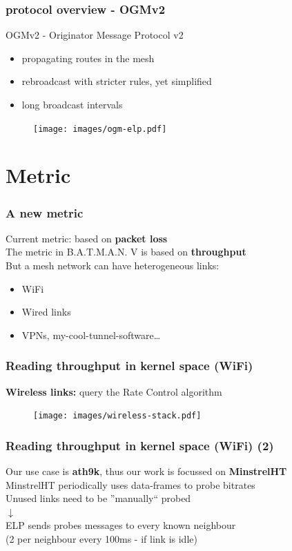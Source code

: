 \documentclass[slidestop]{beamer}
\begin{document}
\begin{frame}[c]
	\frametitle{protocol overview - OGMv2}

	OGMv2 - Originator Message Protocol v2
	\begin{itemize}
		\item propagating routes in the mesh
		\item rebroadcast with stricter rules, yet simplified
		\item long broadcast intervals
	\end{itemize}

	\begin{figure}
		\centering
		\texttt{[image: images/ogm-elp.pdf]}
	\end{figure}
\end{frame}

\section{Metric}
\begin{frame}[c]
	\frametitle{A new metric}
	\begin{center}
		Current metric: based on \textbf{packet loss}\\
		\pause
		\vspace{0.5cm}
		The metric in B.A.T.M.A.N. V is based on \textbf{throughput}\\
		\pause
		\vspace{0.5cm}
		But a mesh network can have heterogeneous links:
		\begin{itemize}
			\item WiFi
			\item Wired links
			\item VPNs, my-cool-tunnel-software\dots
		\end{itemize}
	\end{center}
\end{frame}

\begin{frame}[c]
	\frametitle{Reading throughput in kernel space (WiFi)}
	\textbf{Wireless links:} query the Rate Control algorithm
	\vfill
	\pause
	\begin{figure}
		\centering
		\texttt{[image: images/wireless-stack.pdf]}
	\end{figure}
\end{frame}

\begin{frame}[c]
	\frametitle{Reading throughput in kernel space (WiFi) (2)}
	\begin{center}
	Our use case is \textbf{ath9k}, thus our work is focussed on
	\textbf{MinstrelHT}\\[0.5cm]
	MinstrelHT periodically uses data-frames to probe bitrates\\
	Unused links need to be ''manually`` probed\\[0.5cm]
	\pause
	$\downarrow$\\[0.5cm]
	ELP sends probes messages to every known neighbour\\
	(2 per neighbour every 100ms - if link is idle)
	\end{center}
\end{frame}
\end{document}
